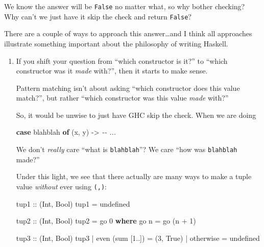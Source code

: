 \documentclass[]{article}
\newenvironment{Shaded}{}{}
\newcommand{\CommentTok}[1]{\textcolor[rgb]{0.38,0.63,0.69}{\textit{#1}}}
\newcommand{\DataTypeTok}[1]{\textcolor[rgb]{0.56,0.13,0.00}{#1}}
\newcommand{\DecValTok}[1]{\textcolor[rgb]{0.25,0.63,0.44}{#1}}
\newcommand{\FunctionTok}[1]{\textcolor[rgb]{0.02,0.16,0.49}{#1}}
\newcommand{\KeywordTok}[1]{\textcolor[rgb]{0.00,0.44,0.13}{\textbf{#1}}}
\newcommand{\NormalTok}[1]{#1}
\newcommand{\OperatorTok}[1]{\textcolor[rgb]{0.40,0.40,0.40}{#1}}
\newcommand{\OtherTok}[1]{\textcolor[rgb]{0.00,0.44,0.13}{#1}}
\begin{document}
We know the answer will be \texttt{False} no matter what, so why bother
checking? Why can't we just have it skip the check and return \texttt{False}?

There are a couple of ways to approach this answer\ldots and I think all
approaches illustrate something important about the philosophy of writing
Haskell.

\begin{enumerate}
\def\labelenumi{\arabic{enumi}.}
\item
  If you shift your question from ``which constructor is it?'' to ``which
  constructor was it \emph{made} with?'', then it starts to make sense.

  Pattern matching isn't about asking ``which constructor does this value
  match?'', but rather ``which constructor was this value \emph{made} with?''

  So, it would be unwise to just have GHC skip the check. When we are doing

\begin{Shaded}
\begin{Highlighting}[]
\KeywordTok{case}\NormalTok{ blahblah }\KeywordTok{of}
\NormalTok{  (x, y) }\OtherTok{{-}\textgreater{}} \CommentTok{{-}{-} ...}
\end{Highlighting}
\end{Shaded}

  We don't \emph{really} care ``what is \texttt{blahblah}''? We care ``how was
  \texttt{blahblah} made?''

  Under this light, we see that there actually are many ways to make a tuple
  value \emph{without} ever using \texttt{(,)}:

\begin{Shaded}
\begin{Highlighting}[]
\OtherTok{tup1 ::}\NormalTok{ (}\DataTypeTok{Int}\NormalTok{, }\DataTypeTok{Bool}\NormalTok{)}
\NormalTok{tup1 }\OtherTok{=} \FunctionTok{undefined}

\OtherTok{tup2 ::}\NormalTok{ (}\DataTypeTok{Int}\NormalTok{, }\DataTypeTok{Bool}\NormalTok{)}
\NormalTok{tup2 }\OtherTok{=}\NormalTok{ go }\DecValTok{0}
  \KeywordTok{where}
\NormalTok{    go n }\OtherTok{=}\NormalTok{ go (n }\OperatorTok{+} \DecValTok{1}\NormalTok{)}

\OtherTok{tup3 ::}\NormalTok{ (}\DataTypeTok{Int}\NormalTok{, }\DataTypeTok{Bool}\NormalTok{)}
\NormalTok{tup3}
  \OperatorTok{|} \FunctionTok{even}\NormalTok{ (}\FunctionTok{sum}\NormalTok{ [}\DecValTok{1}\OperatorTok{..}\NormalTok{]) }\OtherTok{=}\NormalTok{ (}\DecValTok{3}\NormalTok{, }\DataTypeTok{True}\NormalTok{)}
  \OperatorTok{|} \FunctionTok{otherwise}        \OtherTok{=} \FunctionTok{undefined}
\end{Highlighting}
\end{Shaded}


\end{enumerate}
\end{document}
